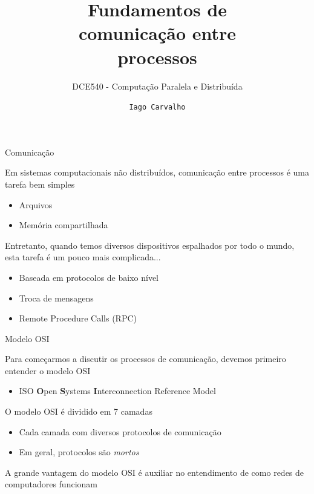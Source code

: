 \documentclass[compress]{beamer}
\title{Fundamentos de \\ comunicação entre \\ processos}
\subtitle{DCE540 - Computação Paralela e Distribuída}
\author{\texttt{Iago Carvalho}}
\institute{\texttt{Departamento de Ciência da Computação}}
\begin{document}
\begin{frame}
\titlepage

\end{frame}


\begin{frame}{Comunicação}

Em sistemas computacionais não distribuídos, comunicação entre processos é uma tarefa bem simples
\begin{itemize}
    \item Arquivos
    \item Memória compartilhada
\end{itemize}

Entretanto, quando temos diversos dispositivos espalhados por todo o mundo, esta tarefa é um pouco mais complicada...
\begin{itemize}
    \item Baseada em protocolos de baixo nível
    \item Troca de mensagens
    \item Remote Procedure Calls (RPC)
\end{itemize}

\end{frame}



\begin{frame}{Modelo OSI}

Para começarmos a discutir os processos de comunicação, devemos primeiro entender o modelo OSI \href{https://pt.wikipedia.org/wiki/Modelo_OSI}{} 
\begin{itemize}
    \item ISO \textbf{O}pen \textbf{S}ystems \textbf{I}nterconnection Reference Model
\end{itemize}

\vspace{0.5cm}

O modelo OSI é dividido em 7 camadas
\begin{itemize}
    \item Cada camada com diversos protocolos de comunicação
    \item Em geral, protocolos são \textit{mortos}
\end{itemize}

\vspace{0.5cm}

A grande vantagem do modelo OSI é auxiliar no entendimento de como redes de computadores funcionam
\end{frame}
\end{document}
